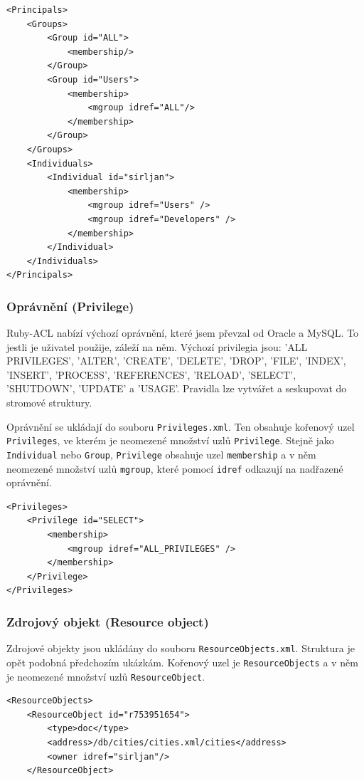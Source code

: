 \lstset{language=XML}
\begin{lstlisting}
<Principals>
    <Groups>
        <Group id="ALL">
            <membership/>
        </Group>
        <Group id="Users">
            <membership>
                <mgroup idref="ALL"/>
            </membership>
        </Group>
    </Groups>
    <Individuals>
        <Individual id="sirljan">
            <membership>
                <mgroup idref="Users" />
                <mgroup idref="Developers" />
            </membership>
        </Individual>
    </Individuals>
</Principals>
\end{lstlisting}

\subsubsection {Oprávnění (Privilege)}
Ruby-ACL nabízí výchozí oprávnění, které jsem převzal od Oracle a MySQL. To jestli je uživatel použije, záleží na něm. 
Výchozí privilegia jsou: 'ALL PRIVILEGES', 'ALTER', 'CREATE', 'DELETE', 'DROP', 'FILE', 'INDEX', 'INSERT', 'PROCESS', 'REFERENCES', 'RELOAD', 'SELECT', 'SHUTDOWN', 'UPDATE' a 'USAGE'.
Pravidla lze vytvářet a seskupovat do stromové struktury.

Oprávnění se ukládají do souboru \verb|Privileges.xml|. Ten obsahuje kořenový uzel \verb|Privileges|, ve kterém je neomezené množství uzlů \verb|Privilege|. Stejně jako \verb|Individual| nebo \verb|Group|, \verb|Privilege| obsahuje uzel \verb|membership| a v něm neomezené množství uzlů \verb|mgroup|, které pomocí \verb|idref| odkazují na nadřazené oprávnění.

\begin{lstlisting}
<Privileges>
    <Privilege id="SELECT">
        <membership>             
            <mgroup idref="ALL_PRIVILEGES" />         
        </membership>
    </Privilege>
</Privileges>
\end{lstlisting}

\subsubsection {Zdrojový objekt (Resource object)}

Zdrojové objekty jsou ukládány do souboru \verb|ResourceObjects.xml|. Struktura je opět podobná předchozím ukázkám. Kořenový uzel je \verb|ResourceObjects| a v něm je neomezené množství uzlů \verb|ResourceObject|.

\begin{lstlisting}
<ResourceObjects>
    <ResourceObject id="r753951654">
        <type>doc</type>
        <address>/db/cities/cities.xml/cities</address>
        <owner idref="sirljan"/>
    </ResourceObject>
\end{lstlisting}


